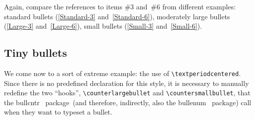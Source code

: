 \documentclass[a4paper]{article}
\DeclareRobustCommand*{\packlass}[1]{%
	{\texorpdfstring{\normalfont \sffamily}{}#1}%
}
\newcommand*{\Bullcntr}{bullcntr}
\newcommand*{\bull}{\packlass{\Bullcntr}}
\newcommand*{\tbull}{the \bull\ package}
\newcommand*{\Bullenum}{bullenum}
\newcommand*{\benu}{\packlass{\Bullenum}}
\newcommand*{\tbenu}{the \benu\ package}
\begin{document}
Again, compare the references to items \#3 and~\#6 from different
examples: standard bullets (\ref{Standard-3} and~\ref{Standard-6}),
moderately large bullets (\ref{Large-3} and~\ref{Large-6}), small
bullets (\ref{Small-3} and~\ref{Small-6}).



\subsection{Tiny bullets}

We come now to a sort of extreme example: the use of
\verb|\textperiodcentered|.  Since there is no predefined declaration
for this style, it is necessary to manually redefine the two
``hooks'', \verb|\counterlargebullet| and \verb|\countersmallbullet|,
that \tbull\ (and therefore, indirectly, also \tbenu) call when they
want to typeset a bullet.
\end{document}

